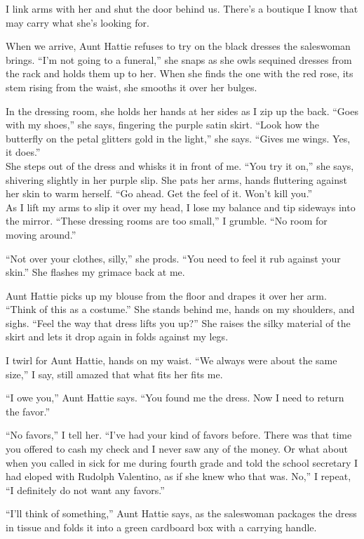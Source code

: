 \documentclass[twoside,10pt]{book}
\begin{document}
I link arms with her and shut the door behind us. There's a boutique I
know that may carry what she's looking for.

When we arrive, Aunt Hattie refuses to try on the black dresses the
saleswoman brings. ``I'm not going to a funeral,'' she snaps as she owls
sequined dresses from the rack and holds them up to her. When she finds
the one with the red rose, its stem rising from the waist, she smooths
it over her bulges.

In the dressing room, she holds her hands at her sides as I zip up the
back. ``Goes with my shoes,'' she says, fingering the purple satin
skirt. ``Look how the butterfly on the petal glitters gold in the
light,'' she says. ``Gives me wings. Yes, it does.''\\
She steps out of the dress and whisks it in front of me. ``You try it
on,'' she says, shivering slightly in her purple slip. She pats her
arms, hands fluttering against her skin to warm herself. ``Go ahead. Get
the feel of it. Won't kill you.''\\
As I lift my arms to slip it over my head, I lose my balance and tip
sideways into the mirror. ``These dressing rooms are too small,'' I
grumble. ``No room for moving around.''

``Not over your clothes, silly,'' she prods. ``You need to feel it rub
against your skin.'' She flashes my grimace back at me.

Aunt Hattie picks up my blouse from the floor and drapes it over her
arm. ``Think of this as a costume.'' She stands behind me, hands on my
shoulders, and sighs. ``Feel the way that dress lifts you up?'' She
raises the silky material of the skirt and lets it drop again in folds
against my legs.

I twirl for Aunt Hattie, hands on my waist. ``We always were about the
same size,'' I say, still amazed that what fits her fits me.

``I owe you,'' Aunt Hattie says. ``You found me the dress. Now I need to
return the favor.''

``No favors,'' I tell her. ``I've had your kind of favors before. There
was that time you offered to cash my check and I never saw any of the
money. Or what about when you called in sick for me during fourth grade
and told the school secretary I had eloped with Rudolph Valentino, as if
she knew who that was. No,'' I repeat, ``I definitely do not want any
favors.''

``I'll think of something,'' Aunt Hattie says, as the saleswoman
packages the dress in tissue and folds it into a green cardboard box
with a carrying handle.
\end{document}

